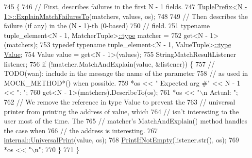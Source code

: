\begin{DoxyCode}
745                                                      \{
746     \textcolor{comment}{// First, describes failures in the first N - 1 fields.}
747     \hyperlink{classtesting_1_1internal_1_1TuplePrefix_af983f3f9254408e6dabe67b511dd22ae}{TuplePrefix<N - 1>::ExplainMatchFailuresTo}(matchers, values, 
      os);
748 
749     \textcolor{comment}{// Then describes the failure (if any) in the (N - 1)-th (0-based)}
750     \textcolor{comment}{// field.}
751     \textcolor{keyword}{typename} tuple\_element<N - 1, MatcherTuple>\hyperlink{namespaceupload_a4fc56f0dd6613be15c3c4dc3af3619ce}{::type} matcher =
752         \textcolor{keyword}{get}<N - 1>(matchers);
753     \textcolor{keyword}{typedef} \textcolor{keyword}{typename} tuple\_element<N - 1, ValueTuple>\hyperlink{namespaceupload_a4fc56f0dd6613be15c3c4dc3af3619ce}{::type} \hyperlink{namespacetesting_ae44c50a3a7f0a46f05c8a0b0592b4a62}{Value};
754     Value value = \textcolor{keyword}{get}<N - 1>(values);
755     StringMatchResultListener listener;
756     \textcolor{keywordflow}{if} (!matcher.MatchAndExplain(value, &listener)) \{
757       \textcolor{comment}{// TODO(wan): include in the message the name of the parameter}
758       \textcolor{comment}{// as used in MOCK\_METHOD*() when possible.}
759       *os << \textcolor{stringliteral}{"  Expected arg #"} << N - 1 << \textcolor{stringliteral}{": "};
760       \textcolor{keyword}{get}<N - 1>(matchers).DescribeTo(os);
761       *os << \textcolor{stringliteral}{"\(\backslash\)n           Actual: "};
762       \textcolor{comment}{// We remove the reference in type Value to prevent the}
763       \textcolor{comment}{// universal printer from printing the address of value, which}
764       \textcolor{comment}{// isn't interesting to the user most of the time.  The}
765       \textcolor{comment}{// matcher's MatchAndExplain() method handles the case when}
766       \textcolor{comment}{// the address is interesting.}
767       \hyperlink{namespacetesting_1_1internal_ad121a890bddf866e59605d1a0198dada}{internal::UniversalPrint}(value, os);
768       \hyperlink{namespacetesting_1_1internal_a77c9e2b66d2b2414db4763971180d53c}{PrintIfNotEmpty}(listener.str(), os);
769       *os << \textcolor{stringliteral}{"\(\backslash\)n"};
770     \}
771   \}
\end{DoxyCode}
